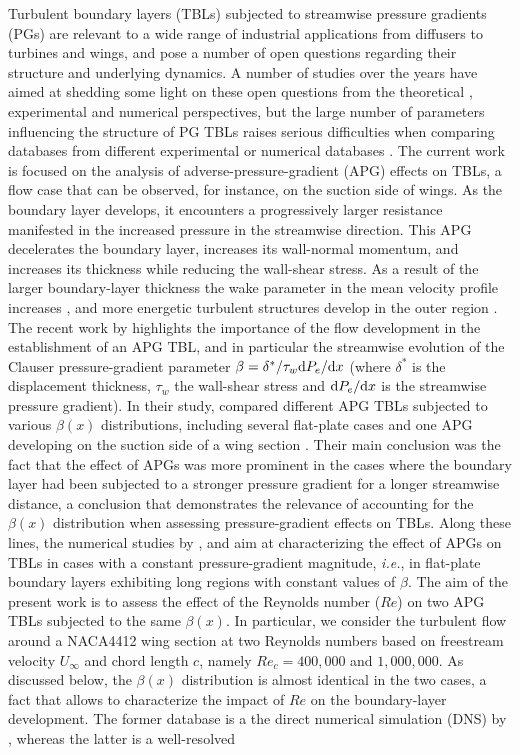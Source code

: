 \documentclass[preprint,12pt,authoryear]{elsarticle}
\begin{document}
Turbulent boundary layers (TBLs) subjected to streamwise pressure gradients (PGs) are relevant to a wide range of industrial applications from diffusers to turbines and wings, and pose a number of open questions regarding their structure and underlying dynamics. A number of studies over the years have aimed at shedding some light on these open questions from the theoretical \citep{townsend,mellor_gibson}, experimental \citep{skare_krogstad,harun_et_al} and numerical \citep{spalart_watmuff,skote_et_al} perspectives, but the large number of parameters influencing the structure of PG TBLs raises serious difficulties when comparing databases from different experimental or numerical databases \citep{monty_et_al}. The current work is focused on the analysis of adverse-pressure-gradient (APG) effects on TBLs, a flow case that can be observed, for instance, on the suction side of wings. As the boundary layer develops, it encounters a progressively larger resistance manifested in the increased pressure in the streamwise direction. This APG decelerates the boundary layer, increases its wall-normal momentum, and increases its thickness while reducing the wall-shear stress. As a result of the larger boundary-layer thickness the wake parameter in the mean velocity profile increases \citep{vinuesa_aiaa}, and more energetic turbulent structures develop in the outer region \citep{maciel_et_al}. The recent work by \cite{bobke_et_al} highlights the importance of the flow development in the establishment of an APG TBL, and in particular the streamwise evolution of the Clauser pressure-gradient parameter $\beta= \delta^{*} / \tau_{w} {\rm d}P_{e} / {\rm d} x$ (where $\delta^{*}$ is the displacement thickness, $\tau_{w}$ the wall-shear stress and ${\rm d}P_{e} / {\rm d} x$ is the streamwise pressure gradient). In their study, \cite{bobke_et_al} compared different APG TBLs subjected to various $\beta(x)$ distributions, including several flat-plate cases and one APG developing on the suction side of a wing section \citep{hosseini_et_al}. Their main conclusion was the fact that the effect of APGs was more prominent in the cases where the boundary layer had been subjected to a stronger pressure gradient for a longer streamwise distance, a conclusion that demonstrates the relevance of accounting for the $\beta(x)$ distribution when assessing pressure-gradient effects on TBLs. Along these lines, the numerical studies by \cite{kitsios_et_al}, \cite{lee} and \cite{bobke_et_al} aim at characterizing the effect of APGs on TBLs in cases with a constant pressure-gradient magnitude, {\it i.e.}, in flat-plate boundary layers exhibiting long regions with constant values of $\beta$.  The aim of the present work is to assess the effect of the Reynolds number ($Re$) on two APG TBLs subjected to the same $\beta(x)$. In particular, we consider the turbulent flow around a NACA4412 wing section at two Reynolds numbers based on freestream velocity $U_{\infty}$ and chord length $c$, namely $Re_{c}=400,000$ and $1,000,000$. As discussed below, the $\beta(x)$ distribution is almost identical in the two cases, a fact that allows to characterize the impact of $Re$ on the boundary-layer development. The former database is a the direct numerical simulation (DNS) by \cite{hosseini_et_al}, whereas the latter is a well-resolved 
\end{document}
